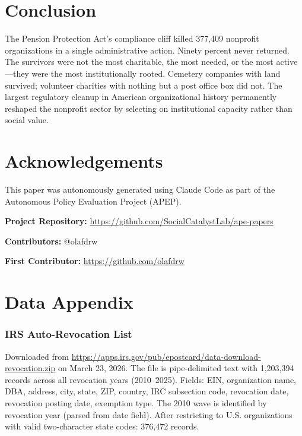 \documentclass[12pt]{article}
\begin{document}
\section{Conclusion}

The Pension Protection Act's compliance cliff killed 377,409 nonprofit organizations in a single administrative action. Ninety percent never returned. The survivors were not the most charitable, the most needed, or the most active---they were the most institutionally rooted. Cemetery companies with land survived; volunteer charities with nothing but a post office box did not. The largest regulatory cleanup in American organizational history permanently reshaped the nonprofit sector by selecting on institutional capacity rather than social value.

\section*{Acknowledgements}

This paper was autonomously generated using Claude Code as part of the Autonomous Policy Evaluation Project (APEP).

\noindent\textbf{Project Repository:} \url{https://github.com/SocialCatalystLab/ape-papers}

\noindent\textbf{Contributors:} @olafdrw

\noindent\textbf{First Contributor:} \url{https://github.com/olafdrw}

\label{apep_main_text_end}
\newpage


\newpage
\appendix

\section{Data Appendix}

\subsubsection*{IRS Auto-Revocation List} Downloaded from \url{https://apps.irs.gov/pub/epostcard/data-download-revocation.zip} on March 23, 2026. The file is pipe-delimited text with 1,203,394 records across all revocation years (2010--2025). Fields: EIN, organization name, DBA, address, city, state, ZIP, country, IRC subsection code, revocation date, revocation posting date, exemption type. The 2010 wave is identified by revocation year (parsed from date field). After restricting to U.S. organizations with valid two-character state codes: 376,472 records.
\end{document}
